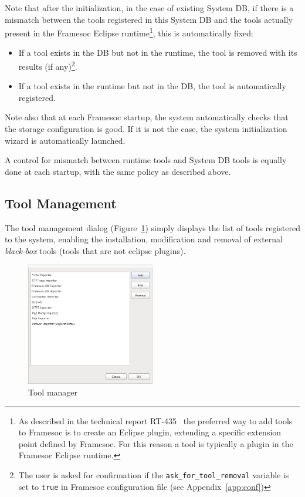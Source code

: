 \documentclass[twoside]{article}
\begin{document}
\begin{sloppypar}
Note that after the initialization, in the case of existing System DB, if there is a mismatch between the tools registered in this System DB and the tools actually present in the Framesoc Eclipse runtime\footnote{As described in the technical report RT-435~\cite{pagano:hal-00830008} the preferred way to add tools to Framesoc is to create an Eclipse plugin, extending a specific extension point defined by Framesoc. For this reason a tool is typically a plugin in the Framesoc Eclipse runtime.}, this is automatically fixed:
\begin{itemize}
 \item If a tool exists in the DB but not in the runtime, the tool is removed with its results (if any)\footnote{The user is asked for confirmation if the \texttt{ask\_for\_tool\_removal} variable is set to \texttt{true} in Framesoc configuration file (see Appendix~\ref{app:conf})}.
 \item If a tool exists in the runtime but not in the DB, the tool is automatically registered.
\end{itemize}

Note also that at each Framesoc startup, the system automatically checks that the storage configuration is good. 
If it is not the case, the system initialization wizard is automatically launched.

A control for mismatch between runtime tools and System DB tools is equally done at each startup, with the same policy as described above.

\subsection{Tool Management}
\label{subsec:tools}

The tool management dialog (Figure~\ref{fig:manage_tools}) simply displays the list of tools registered to the system, 
enabling the installation, modification and removal of external \emph{black-box} tools (tools that are not eclipse plugins).

\begin{figure}[h!]
  \centering
    \includegraphics[width=0.5\textwidth]{images/manage_tools.png}
  \caption{Tool manager}
  \label{fig:manage_tools}
\end{figure}


\end{sloppypar}
\end{document}
